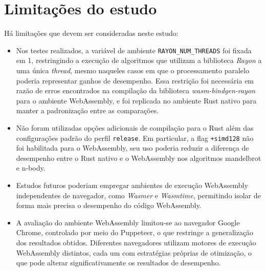 \section{Limitações do estudo}

Há limitações que devem ser consideradas neste estudo:

\begin{itemize}
    \item Nos testes realizados, a variável de ambiente \texttt{RAYON\_NUM\_THREADS} foi fixada em 1, restringindo a execução de algoritmos que utilizam a biblioteca \emph{Rayon} a uma única \emph{thread}, mesmo naqueles casos em que o processamento paralelo poderia representar ganhos de desempenho. Essa restrição foi necessária em razão de erros encontrados na compilação da biblioteca \emph{wasm-bindgen-rayon} para o ambiente WebAssembly, e foi replicada no ambiente Rust nativo para manter a padronização entre as comparações.
    \item Não foram utilizadas opções adicionais de compilação para o Rust além das configurações padrão do perfil \texttt{release}. Em particular, a flag \texttt{+simd128} não foi habilitada para o WebAssembly, seu uso poderia reduzir a diferença de desempenho entre o Rust nativo e o WebAssembly nos algoritmos mandelbrot e n-body.
    \item Estudos futuros poderiam empregar ambientes de execução WebAssembly independentes de navegador, como \emph{Wasmer} e \emph{Wasmtime}, permitindo isolar de forma mais precisa o desempenho do código WebAssembly.
    \item A avaliação do ambiente WebAssembly limitou-se ao navegador Google Chrome, controlado por meio do Puppeteer, o que restringe a generalização dos resultados obtidos. Diferentes navegadores utilizam motores de execução WebAssembly distintos, cada um com estratégias próprias de otimização, o que pode alterar significativamente os resultados de desempenho.
\end{itemize}
